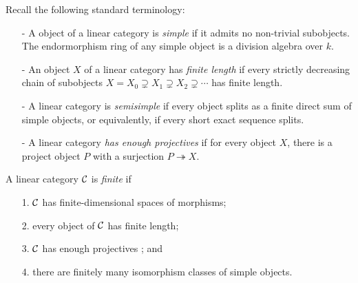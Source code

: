 \documentclass{amsart}
\begin{document}
Recall the following standard terminology:
\begin{itemize}
	\item[-] A object of a linear category is {\em simple} if it admits no non-trivial subobjects. The endormorphism ring of any simple object is a division algebra over $k$. 
	\item[-] An object $X$ of a linear category has {\em finite length} if every strictly decreasing chain of subobjects $X = X_0 \supsetneq X_1 \supsetneq X_2 \supsetneq  \cdots$ has finite length. 
	\item[-] A linear category is {\em semisimple} if every object splits as a finite direct sum of simple objects, or equivalently, if every short exact sequence splits.  %
	\item[-] A linear category {\em has enough projectives} if for every object $X$, there is a project object $P$ with a surjection $P \twoheadrightarrow X$. 
\end{itemize}


\begin{definition} %
	A linear category $\mathcal C$ is {\em finite} if 
	\begin{enumerate}
		\item[1.] $\mathcal C$ has finite-dimensional spaces of morphisms;
		\item[2.] every object of $\mathcal C$ has finite length;
		\item[3.] $\mathcal C$ has enough projectives%
		; and
		\item[4.] there are finitely many isomorphism classes of simple objects.  
	\end{enumerate}
\end{definition}
\end{document}
